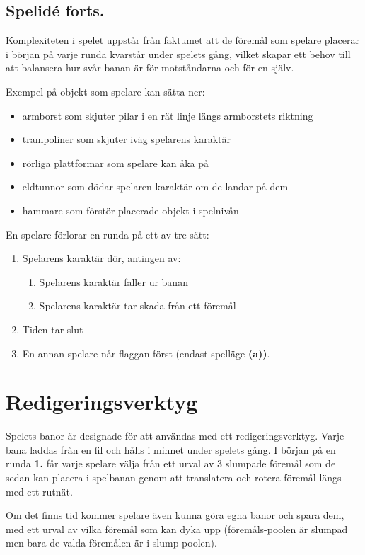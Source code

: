 \documentclass{article}
\begin{document}
\subsection{Spelidé forts.}
Komplexiteten i spelet uppstår från faktumet att de föremål som spelare placerar i början på varje runda kvarstår under spelets gång, vilket skapar ett behov till att balansera hur svår banan är för motståndarna och för en själv.

Exempel på objekt som spelare kan sätta ner:
\begin{itemize}
    \item armborst som skjuter pilar i en rät linje längs armborstets riktning
    \item trampoliner som skjuter iväg spelarens karaktär
    \item rörliga plattformar som spelare kan åka på
    \item eldtunnor som dödar spelaren karaktär om de landar på dem
    \item hammare som förstör placerade objekt i spelnivån
\end{itemize}

En spelare förlorar en runda på ett av tre sätt:

\begin{enumerate}
    \item Spelarens karaktär dör, antingen av:
    \begin{enumerate}
        \item Spelarens karaktär faller ur banan
        \item Spelarens karaktär tar skada från ett föremål
    \end{enumerate}
    \item Tiden tar slut
    \item En annan spelare når flaggan först (endast spelläge \textbf{(a))}.
\end{enumerate}

\section{Redigeringsverktyg}

Spelets banor är designade för att användas med ett redigeringsverktyg. Varje bana laddas från en fil och hålls i minnet under spelets gång. I början på en runda \textbf{1.} får varje spelare välja från ett urval av 3 slumpade föremål som de sedan kan placera i spelbanan genom att translatera och rotera föremål längs med ett rutnät. 

Om det finns tid kommer spelare även kunna göra egna banor och spara dem, med ett urval av vilka föremål som kan dyka upp (föremåls-poolen är slumpad men bara de valda föremålen är i slump-poolen).
\end{document}
